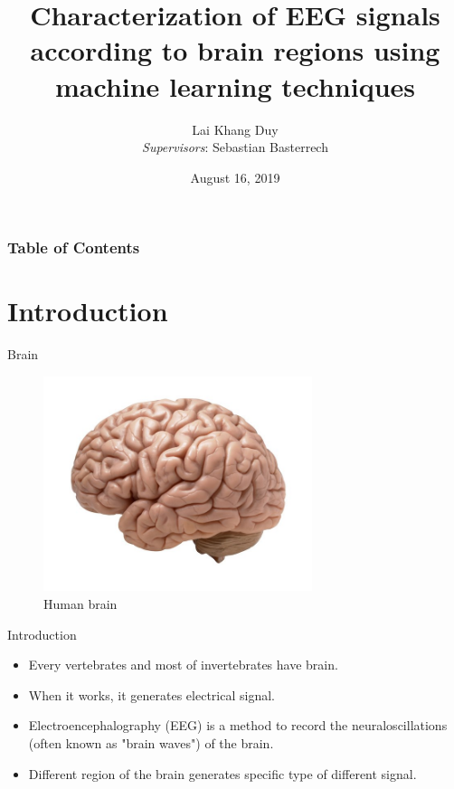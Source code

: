 \documentclass[xcolor=dvipsnames]{beamer} %
\title[EEGSignal]{Characterization of EEG signals according to brain regions using machine learning techniques}
\author[Lai Khang Duy]{Lai Khang Duy \texorpdfstring{ \\ [4mm] 
		{\small \textit{Supervisors}: Sebastian Basterrech}}{}}
\institute[]{ICT Department - University of Science and Technology of Hanoi}
\date{August 16, 2019}
\begin{document}
	\frame{\titlepage}
	
	\begin{frame}
		\frametitle{Table of Contents}
		\tableofcontents
	\end{frame}

	\section{Introduction}
	
	\begin{frame}{Brain}
		\begin{figure}
		    \centering
		    \includegraphics[width=0.7\textwidth]{images/brain1.jpg}
		    \caption{Human brain}
		    \label{fig:brain}
		\end{figure}
	\end{frame}
	
	\begin{frame}{Introduction}
	    \begin{itemize}
	        \item Every vertebrates and most of invertebrates have brain.
	        \item When it works, it generates electrical signal.
	        \item Electroencephalography (EEG) is a method to record the neuraloscillations (often known as "brain waves") of the brain.
	        \item Different region of the brain generates specific type of different signal.
	    \end{itemize}
	\end{frame}
	
\end{document}

